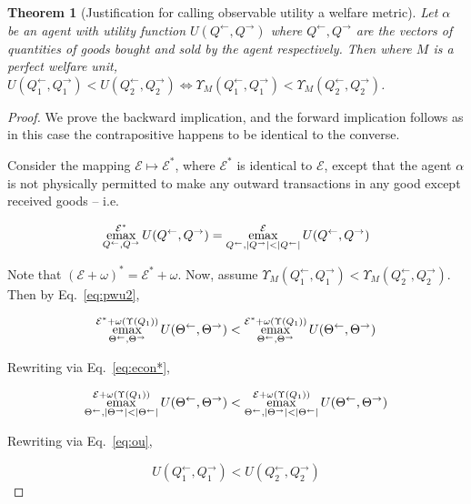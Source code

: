 \documentclass{journal}
\theoremstyle{plain}
\newtheorem{thm}{Theorem}
\theoremstyle{definition}
\newcommand{\economy}{\ensuremath{\mathcal{E}}}
\newcommand{\emax}{\ensuremath{\operatornamewithlimits{emax}}}
\begin{document}
\begin{thm}[Justification for calling observable utility a welfare metric]
    \label{thm:welfare}
    Let $\alpha$ be an agent with utility function $U(Q^{\leftarrow}, Q^{\rightarrow})$ where $Q^\leftarrow, Q^\rightarrow$ are the vectors of quantities of goods bought and sold by the agent respectively. Then where $M$ is a perfect welfare unit, $U(Q_1^\leftarrow, Q_1^\rightarrow)<U(Q_2^\leftarrow, Q_2^\rightarrow) \iff \Upsilon_M(Q_1^\leftarrow, Q_1^\rightarrow)<\Upsilon_M(Q_2^\leftarrow, Q_2^\rightarrow)$.
\end{thm}
\begin{proof}
    We prove the backward implication, and the forward implication follows as in this case the contrapositive happens to be identical to the converse.
    
    Consider the mapping $\economy\mapsto\economy^*$, where $\economy^*$ is identical to $\economy$, except that the agent $\alpha$ is not physically permitted to make any outward transactions in any good except received goods -- i.e.
    
    \begin{equation}
        \label{eq:econ*}
        \emax\limits_{Q^\leftarrow, Q^\rightarrow}^{\economy^*} U(Q^\leftarrow, Q^\rightarrow) = 
        \emax\limits_{Q^\leftarrow, |Q^\rightarrow|<|Q^\leftarrow|}^{\economy} U(Q^\leftarrow, Q^\rightarrow)
    \end{equation}
    
    Note that $(\economy + \omega)^* = \economy^* + \omega$. Now, assume $\Upsilon_M(Q_1^\leftarrow, Q_1^\rightarrow)<\Upsilon_M(Q_2^\leftarrow, Q_2^\rightarrow)$. Then by Eq.~\ref{eq:pwu2}, 
    
    \begin{equation*}
        \emax\limits_{\Theta^\leftarrow, \Theta^\rightarrow}^{\economy^* + \omega(\Upsilon(Q_1))} U(\Theta^\leftarrow, \Theta^\rightarrow) < \emax\limits_{\Theta^\leftarrow, \Theta^\rightarrow}^{\economy^*+\omega(\Upsilon(Q_1))} U(\Theta^\leftarrow, \Theta^\rightarrow)
    \end{equation*}
    
    Rewriting via Eq.~\ref{eq:econ*}, 
    
    \begin{equation*}
        \emax\limits_{\Theta^\leftarrow, |\Theta^\rightarrow|<|\Theta^\leftarrow|}^{\economy + \omega(\Upsilon(Q_1))} U(\Theta^\leftarrow, \Theta^\rightarrow) < \emax\limits_{\Theta^\leftarrow, |\Theta^\rightarrow|<|\Theta^\leftarrow|}^{\economy+\omega(\Upsilon(Q_1))} U(\Theta^\leftarrow, \Theta^\rightarrow)
    \end{equation*}
    
    Rewriting via Eq.~\ref{eq:ou},
    
    \begin{equation*}
        U(Q_1^\leftarrow, Q_1^\rightarrow) < U(Q_2^\leftarrow, Q_2^\rightarrow) 
    \end{equation*}
\end{proof}
\end{document}
